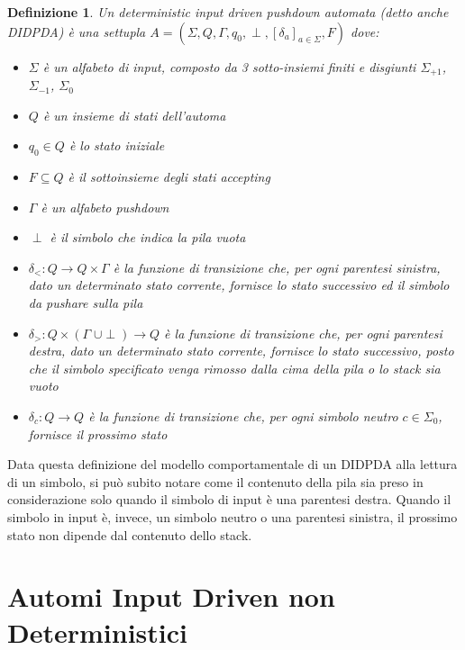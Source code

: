 \documentclass[a4paper,12pt]{report}
\newtheorem{definition}{Definizione}[chapter]
\begin{document}
    \begin{definition}
        Un \textit{deterministic input driven pushdown automata} (detto anche \textit{DIDPDA}) è una settupla $A = (\Sigma, Q, \Gamma, q_0, \perp, \left[ \delta_a \right]_{a \in \Sigma}, F)$ dove:
        \begin{itemize}
            \item $\Sigma$ è un alfabeto di input, composto da 3 sotto-insiemi finiti e disgiunti $\Sigma_{+1}$, $\Sigma_{-1}$, $\Sigma_{0}$
            \item $Q$ è un insieme di stati dell'automa
            \item $q_{0} \in Q$ è lo stato iniziale
            \item $F \subseteq Q$ è il sottoinsieme degli stati \textit{accepting}
            \item $\Gamma$ è un \textit{alfabeto pushdown}
            \item $\perp$ è il simbolo che indica la pila vuota
            \item $\delta_{<} : Q \rightarrow Q \times \Gamma$ è la funzione di transizione che, per ogni parentesi sinistra, dato un determinato stato corrente, fornisce lo stato successivo ed il simbolo da pushare sulla pila
            \item $\delta_{>} : Q \times (\Gamma\;\cup\perp) \rightarrow Q$ è la funzione di transizione che, per ogni parentesi destra, dato un determinato stato corrente, fornisce lo stato successivo, posto che il simbolo specificato venga rimosso dalla cima della pila o lo stack sia vuoto
            \item $\delta_{c} : Q \rightarrow Q$ è la funzione di transizione che, per ogni simbolo neutro $c \in \Sigma_{0}$, fornisce il prossimo stato
        \end{itemize}
    \end{definition}

    Data questa definizione del modello comportamentale di un DIDPDA alla lettura di un simbolo, si può subito notare come il contenuto della pila
    sia preso in considerazione solo quando il simbolo di input è una parentesi destra. Quando il simbolo in input è, invece, un simbolo neutro o
    una parentesi sinistra, il prossimo stato non dipende dal contenuto dello stack.

    \section{Automi Input Driven non Deterministici}
\end{document}
